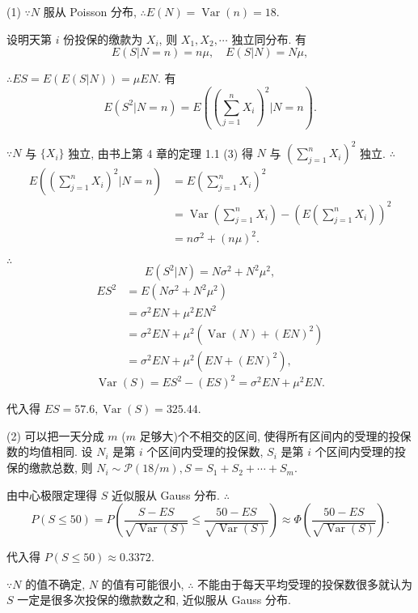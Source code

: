 \documentclass[color=black,device=normal,lang=cn]{elegantnote}
\numberwithin{equation}{section}
\theoremstyle{plain}
\numberwithin{exercise}{exsection}
\begin{document}
\begin{solution}
    (1) $\because N$ 服从 Poisson 分布, $\therefore E(N)=\operatorname{Var}(n)=18$.
    
    设明天第 $i$ 份投保的缴款为 $X_i$, 则 $X_1,X_2,\cdots$ 独立同分布. 有
    \[E(S|N=n)=n\mu,\quad E(S|N)=N\mu,\]
    
    $\therefore ES=E(E(S|N))=\mu EN$. 有
    \[E(S^2|N=n)=E\left(\left(\sum\limits_{j=1}^nX_i\right)^2\Bigg|N=n\right).\]

    $\because N$ 与 $\{X_i\}$ 独立, 由书上第 4 章的定理 1.1 (3) 得 $N$ 与 $\left(\sum\limits_{j=1}^nX_i\right)^2$ 独立. $\therefore$
    \begin{align*}
        E\left(\left(\sum\limits_{j=1}^nX_i\right)^2\Bigg|N=n\right) & =E\left(\sum\limits_{j=1}^nX_i\right)^2 \\
        & =\operatorname{Var}\left(\sum\limits_{j=1}^nX_i\right)-\left(E\left(\sum\limits_{j=1}^nX_i\right)\right)^2 \\
        & =n\sigma^2+(n\mu)^2.
    \end{align*}

    $\therefore$
    \[E(S^2|N)=N\sigma^2+N^2\mu^2,\]
    \begin{align*}
        ES^2 & =E(N\sigma^2+N^2\mu^2) \\
        & =\sigma^2EN+\mu^2EN^2 \\
        & =\sigma^2EN+\mu^2(\operatorname{Var}(N)+(EN)^2) \\
        & =\sigma^2EN+\mu^2(EN+(EN)^2),
    \end{align*}
    \[\operatorname{Var}(S)=ES^2-(ES)^2=\sigma^2EN+\mu^2EN.\]

    代入得 $ES=57.6,\operatorname{Var}(S)=325.44$.

    (2) 可以把一天分成 $m$ ($m$ 足够大)个不相交的区间, 使得所有区间内的受理的投保数的均值相同. 设 $N_i$ 是第 $i$ 个区间内受理的投保数, $S_i$ 是第 $i$ 个区间内受理的投保的缴款总数, 则 $N_i\sim\mathcal{P}(18/m),S=S_1+S_2+\cdots+S_m$.

    由中心极限定理得 $S$ 近似服从 Gauss 分布. $\therefore$
    \[P(S\leq50)=P\left(\dfrac{S-ES}{\sqrt{\operatorname{Var}(S)}}\leq\dfrac{50-ES}{\sqrt{\operatorname{Var}(S)}}\right)\approx\Phi\left(\dfrac{50-ES}{\sqrt{\operatorname{Var}(S)}}\right).\]

    代入得 $P(S\leq50)\approx0.3372$.
\end{solution}
\begin{remark}
    $\because N$ 的值不确定, $N$ 的值有可能很小, $\therefore$ 不能由于每天平均受理的投保数很多就认为 $S$ 一定是很多次投保的缴款数之和, 近似服从 Gauss 分布.
\end{remark}
\end{document}
